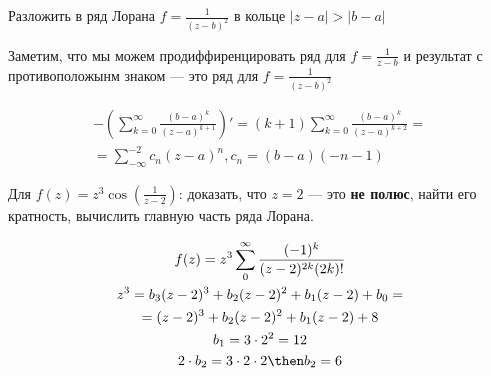 \begin{exmpl}
    Разложить в ряд Лорана $f = \frac{1}{(z - b)^2}$ в кольце $|z - a| > |b - a|$
\end{exmpl}
\begin{sol}
    Заметим, что мы можем продиффиренцировать ряд для $f = \frac{1}{z - b}$ и результат с противоположынм знаком --- это ряд для $f = \frac{1}{(z - b)^2}$

    \begin{gather*}
        - \left( \sum\limits_{k = 0}^{\infty} \frac{(b - a)^k}{(z - a)^{k + 1}} \right)' = (k + 1)\sum\limits_{k = 0}^{\infty} \frac{(b - a)^k}{(z - a)^{k + 2}} = \\ 
        = \sum\limits_{-\infty}^{-2}c_n(z - a)^n, c_n = (b - a)(-n - 1)
    \end{gather*}
\end{sol}

\begin{exmpl}
    Для $f(z) = z^3 \cos \left( \frac{1}{z - 2} \right)$: доказать, что $z = 2$ --- это \textbf{не полюс}, найти его кратность, вычислить главную часть ряда Лорана.
\end{exmpl}
\begin{sol}
    \begin{gather*}
        f(z) = z^3 \sum\limits_0^{\infty}\frac{(-1)^k}{(z - 2)^{2k} (2k)!}\\ 
        z^3 = b_3(z - 2)^3 + b_2(z - 2)^2 + b_1(z - 2) + b_0 = \\
        = (z -2)^3 + b_2(z - 2)^2 + b_1(z - 2) + 8 \\
        b_1 = 3 \cdot 2^2 = 12 \\ 
        2\cdot b_2 = 3 \cdot 2 \cdot 2 \then b_2 = 6
    \end{gather*}
\end{sol}